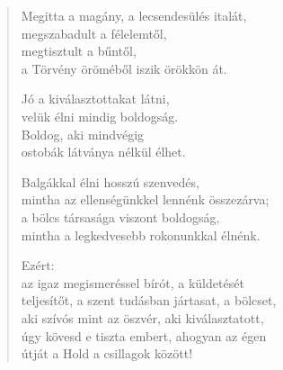 \begin{verse}
 Megitta a magány, a lecsendesülés italát,\\
megszabadult a félelemtől,\\
megtisztult a bűntől,\\
a Törvény öröméből iszik örökkön át.

 Jó a kiválasztottakat látni,\\
velük élni mindig boldogság.\\
Boldog, aki mindvégig\\
ostobák látványa nélkül élhet.

 Balgákkal élni hosszú szenvedés,\\
mintha az ellenségünkkel lennénk összezárva;\\
a bölcs társasága viszont boldogság,\\
mintha a legkedvesebb rokonunkkal élnénk.

 Ezért:\\
az igaz megismeréssel bírót, a küldetését\\
teljesítőt, a szent tudásban jártasat, a bölcset,\\
aki szívós mint az öszvér, aki kiválasztatott,\\
úgy kövesd e tiszta embert, ahogyan az égen\\
útját a Hold a csillagok között!

\end{verse}
